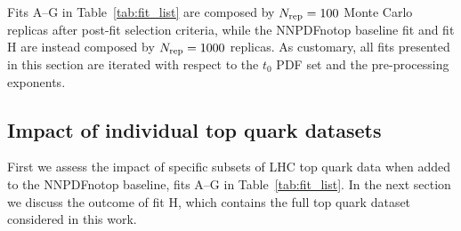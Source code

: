 \documentclass[withindex,glossary]{cam-thesis}
\begin{document}
 Fits A--G in Table~\ref{tab:fit_list}  are composed by $N_{\rm rep}=100$ Monte Carlo replicas after post-fit selection criteria, while the NNPDFnotop baseline fit and fit H are instead composed by $N_{\rm rep}=1000$  replicas.
%
 As customary, all fits presented in this section are iterated with respect
 to the $t_0$ PDF set and the pre-processing exponents.



\subsection{Impact of individual top quark datasets}
\label{sec:individual}

First we assess the impact of specific subsets of LHC top quark data when added
to the NNPDFnotop baseline, fits A--G in Table~\ref{tab:fit_list}. 
In the next section we discuss the outcome of fit H, which contains the full
top quark dataset considered in this work.
\end{document}
